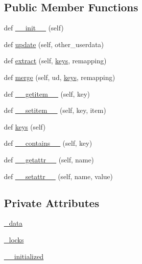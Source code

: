 \subsection*{Public Member Functions}
\begin{DoxyCompactItemize}
\item 
def \hyperlink{classsmacc__viewer_1_1smacc__user__data_1_1UserData_a9d0cbc8234406476ad31e187365f274b}{\+\_\+\+\_\+init\+\_\+\+\_\+} (self)
\item 
def \hyperlink{classsmacc__viewer_1_1smacc__user__data_1_1UserData_a5070648cfbc9fe3c0df826b47692034e}{update} (self, other\+\_\+userdata)
\item 
def \hyperlink{classsmacc__viewer_1_1smacc__user__data_1_1UserData_a1bb1984f83635b7577fa8d54ff0125b8}{extract} (self, \hyperlink{classsmacc__viewer_1_1smacc__user__data_1_1UserData_ade491460c20e71e62249828d1e977c78}{keys}, remapping)
\item 
def \hyperlink{classsmacc__viewer_1_1smacc__user__data_1_1UserData_a178f841fbf56a062a4bfcf786e185e00}{merge} (self, ud, \hyperlink{classsmacc__viewer_1_1smacc__user__data_1_1UserData_ade491460c20e71e62249828d1e977c78}{keys}, remapping)
\item 
def \hyperlink{classsmacc__viewer_1_1smacc__user__data_1_1UserData_a15e25b90740b4b779b3d713ff9ed0c8c}{\+\_\+\+\_\+getitem\+\_\+\+\_\+} (self, key)
\item 
def \hyperlink{classsmacc__viewer_1_1smacc__user__data_1_1UserData_ad63b6e87d3aa15d51beed9534976f62b}{\+\_\+\+\_\+setitem\+\_\+\+\_\+} (self, key, item)
\item 
def \hyperlink{classsmacc__viewer_1_1smacc__user__data_1_1UserData_ade491460c20e71e62249828d1e977c78}{keys} (self)
\item 
def \hyperlink{classsmacc__viewer_1_1smacc__user__data_1_1UserData_a7c5a4c69608211e573472677ea9eb0b1}{\+\_\+\+\_\+contains\+\_\+\+\_\+} (self, key)
\item 
def \hyperlink{classsmacc__viewer_1_1smacc__user__data_1_1UserData_a2ed490d56682639506b0d9b759211cc8}{\+\_\+\+\_\+getattr\+\_\+\+\_\+} (self, name)
\item 
def \hyperlink{classsmacc__viewer_1_1smacc__user__data_1_1UserData_ad5a3d734ac0117d543271fc19be3bc70}{\+\_\+\+\_\+setattr\+\_\+\+\_\+} (self, name, value)
\end{DoxyCompactItemize}
\subsection*{Private Attributes}
\begin{DoxyCompactItemize}
\item 
\hyperlink{classsmacc__viewer_1_1smacc__user__data_1_1UserData_a046fa6b42f6a4a6c4c013c951c78e42f}{\+\_\+data}
\item 
\hyperlink{classsmacc__viewer_1_1smacc__user__data_1_1UserData_a53c6c29cad429091048d85d1f6eaba2f}{\+\_\+locks}
\item 
\hyperlink{classsmacc__viewer_1_1smacc__user__data_1_1UserData_a05765f72e17ffc196fca63bc6829db59}{\+\_\+\+\_\+initialized}
\end{DoxyCompactItemize}



